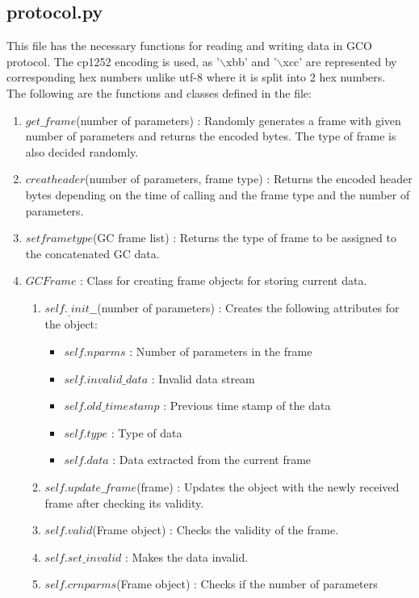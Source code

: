 \subsection{protocol.py}
This file has the necessary functions for reading and writing data in GCO
protocol. The cp1252 encoding is used, as '$\backslash$xbb' and
'$\backslash$xcc' are represented by corresponding hex numbers unlike utf-8
where it is split into 2 hex numbers.\\
The following are the functions and classes defined in the file:
\begin{enumerate}
	\item $get\_frame$(number of parameters) : Randomly generates a
		frame with given number of parameters and returns the encoded bytes.
		The type of frame is also decided randomly.
	\item $creatheader$(number of parameters, frame type) : Returns
		the encoded header bytes depending on the time of calling and the frame
		type and the number of parameters.
	\item $setframetype$(GC frame list) : Returns the type of frame to be
		assigned to the concatenated GC data.
	\item $GCFrame$ : Class for creating frame objects for storing current
		data.
		\begin{enumerate}
			\item $self._\_init\_\_$(number of parameters) : Creates the following
				attributes for the object:
				\begin{itemize}
					\item $self.nparms$ : Number of parameters in the frame
					\item $self.invalid\_data$ : Invalid data stream
					\item $self.old\_timestamp$ : Previous time stamp of the
						data
					\item $self.type$ : Type of data
					\item $self.data$ : Data extracted from the current frame
				\end{itemize}
			\item $self.update\_frame$(frame) : Updates the object with the newly
				received frame after checking its validity.
			\item $self.valid$(Frame object) : Checks the validity of the frame.
			\item $self.set\_invalid$ : Makes the data invalid.
			\item $self.crnparms$(Frame object) : Checks if the number of parameters

\end{enumerate}
\end{enumerate}
